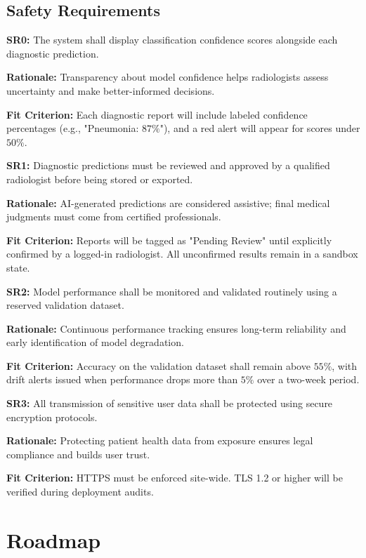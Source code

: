 \documentclass{article}
\begin{document}
\subsection{Safety Requirements}

\textbf{SR0:} The system shall display classification confidence scores alongside each diagnostic prediction.

\textbf{Rationale:} Transparency about model confidence helps radiologists assess uncertainty and make better-informed decisions.

\textbf{Fit Criterion:} Each diagnostic report will include labeled confidence percentages (e.g., "Pneumonia: $87\%$"), and a red alert will appear for scores under $ 50\%$.

\textbf{SR1:} Diagnostic predictions must be reviewed and approved by a qualified radiologist before being stored or exported.

\textbf{Rationale:} AI-generated predictions are considered assistive; final medical judgments must come from certified professionals.

\textbf{Fit Criterion:} Reports will be tagged as "Pending Review" until explicitly confirmed by a logged-in radiologist. All unconfirmed results remain in a sandbox state.

\textbf{SR2:} Model performance shall be monitored and validated routinely using a reserved validation dataset.

\textbf{Rationale:} Continuous performance tracking ensures long-term reliability and early identification of model degradation.

\textbf{Fit Criterion:} Accuracy on the validation dataset shall remain above $ 55\%$, with drift alerts issued when performance drops more than $ 5\%$ over a two-week period.

\textbf{SR3:} All transmission of sensitive user data shall be protected using secure encryption protocols.

\textbf{Rationale:} Protecting patient health data from exposure ensures legal compliance and builds user trust.

\textbf{Fit Criterion:} HTTPS must be enforced site-wide. TLS 1.2 or higher will be verified during deployment audits.

\section{Roadmap}

\end{document}
